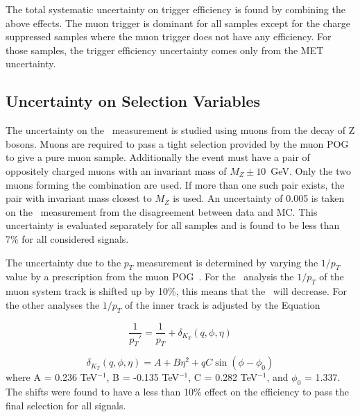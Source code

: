 The total systematic uncertainty on trigger efficiency is found by combining the above effects. 
The muon trigger is dominant for all samples except for the charge suppressed samples where the muon trigger does not have any efficiency.
For those samples, the trigger efficiency uncertainty comes only from the MET uncertainty.


\subsection{Uncertainty on Selection Variables}

The uncertainty on the \invbeta\ measurement is studied using muons from the decay of Z bosons. Muons are required to pass a tight selection provided by the muon POG to
give a pure muon sample. Additionally the event must have a pair of oppositely charged muons with an invariant mass of $M_Z \pm 10$~GeV. Only the two muons forming the combination
are used. If more than one such pair exists, the pair with invariant mass closest to $M_Z$ is used. An uncertainty of 0.005 is taken on the \invbeta\ measurement
from the disagreement between data and MC. This uncertainty is evaluated separately for all samples and is found
to be less than 7\% for all considered signals.

The uncertainty due to the $p_T$ measurement is determined by varying the $1/p_T$ value by a prescription from the muon POG~\cite{2012JInst...7P0002T}. For the \muononly\
analysis the $1/p_T$ of the muon system track is shifted up by 10\%, this means that the \pt\ will decrease.
For the other analyses the $1/p_T$ of the inner track is adjusted by the Equation

\begin{equation}
 \frac{1}{p_T\prime} = \frac{1}{p_T} + \delta_{K_T}(q, \phi, \eta)
\end{equation}

\begin{equation}
 \delta_{K_T}(q, \phi, \eta) = A + B\eta^2 + qC\sin(\phi - \phi_0)
\end{equation}
where A = 0.236 TeV$^{-1}$, B = -0.135 TeV$^{-1}$,
C = 0.282 TeV$^{-1}$, and $\phi_0$ = 1.337. The shifts were found to have a less than 10\% effect on the efficiency to pass the final selection for all signals.

